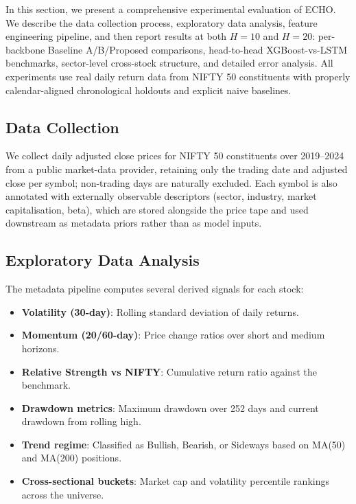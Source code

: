 \documentclass[12pt,a4paper,titlepage]{article}
\begin{document}
In this section, we present a comprehensive experimental evaluation of ECHO. We describe the data collection process, exploratory data analysis, feature engineering pipeline, and then report results at both \(H=10\) and \(H=20\): per-backbone Baseline A/B/Proposed comparisons, head-to-head XGBoost-vs-LSTM benchmarks, sector-level cross-stock structure, and detailed error analysis. All experiments use real daily return data from NIFTY 50 constituents with properly calendar-aligned chronological holdouts and explicit naive baselines.

\subsection{Data Collection}

We collect daily adjusted close prices for NIFTY 50 constituents over 2019--2024 from a public market-data provider, retaining only the trading date and adjusted close per symbol; non-trading days are naturally excluded. Each symbol is also annotated with externally observable descriptors (sector, industry, market capitalisation, beta), which are stored alongside the price tape and used downstream as metadata priors rather than as model inputs.

\subsection{Exploratory Data Analysis}

The metadata pipeline computes several derived signals for each stock:
\begin{itemize}
    \item \textbf{Volatility (30-day)}: Rolling standard deviation of daily returns.
    \item \textbf{Momentum (20/60-day)}: Price change ratios over short and medium horizons.
    \item \textbf{Relative Strength vs NIFTY}: Cumulative return ratio against the benchmark.
    \item \textbf{Drawdown metrics}: Maximum drawdown over 252 days and current drawdown from rolling high.
    \item \textbf{Trend regime}: Classified as Bullish, Bearish, or Sideways based on MA(50) and MA(200) positions.
    \item \textbf{Cross-sectional buckets}: Market cap and volatility percentile rankings across the universe.
\end{itemize}
\end{document}
